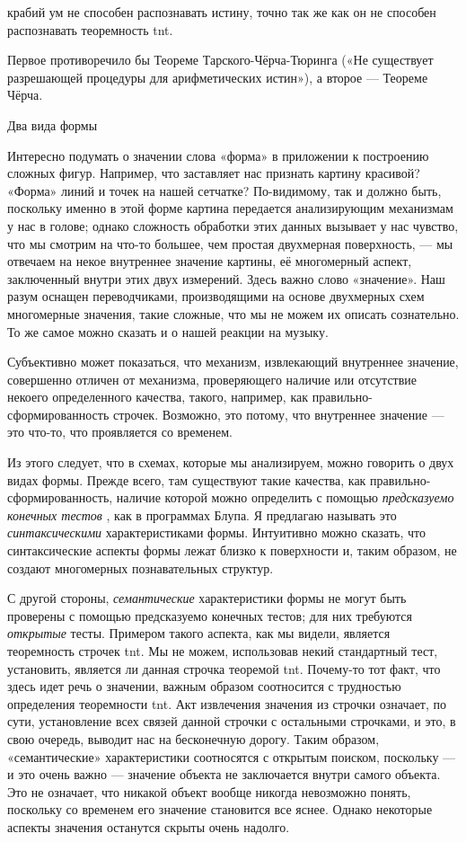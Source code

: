 \documentclass[../main.tex]{subfiles}
\begin{document}
крабий ум не способен распознавать истину, точно так же как он не способен распознавать теоремность \acs{tnt}.

Первое противоречило бы Теореме Тарского-Чёрча-Тюринга («Не существует разрешающей процедуры для арифметических истин»), а второе --- Теореме Чёрча.

Два вида формы

Интересно подумать о значении слова «форма» в приложении к построению сложных фигур. Например, что заставляет нас признать картину красивой? «Форма» линий и точек на нашей сетчатке? По-видимому, так и должно быть, поскольку именно в этой форме картина передается анализирующим механизмам у нас в голове; однако сложность обработки этих данных вызывает у нас чувство, что мы смотрим на что-то большее, чем простая двухмерная поверхность, --- мы отвечаем на некое внутреннее значение картины, её многомерный аспект, заключенный внутри этих двух измерений. Здесь важно слово «значение». Наш разум оснащен переводчиками, производящими на основе двухмерных схем многомерные значения, такие сложные, что мы не можем их описать сознательно. То же самое можно сказать и о нашей реакции на музыку.

Субъективно может показаться, что механизм, извлекающий внутреннее значение, совершенно отличен от механизма, проверяющего наличие или отсутствие некоего определенного качества, такого, например, как правильно-сформированность строчек. Возможно, это потому, что внутреннее значение --- это что-то, что проявляется со временем.

Из этого следует, что в схемах, которые мы анализируем, можно говорить о двух видах формы. Прежде всего, там существуют такие качества, как правильно-сформированность, наличие которой можно определить с помощью \emph{предсказуемо конечных тестов} , как в программах Блупа. Я предлагаю называть это \emph{синтаксическими} характеристиками формы. Интуитивно можно сказать, что синтаксические аспекты формы лежат близко к поверхности и, таким образом, не создают многомерных познавательных структур.

С другой стороны, \emph{семантические} характеристики формы не могут быть проверены с помощью предсказуемо конечных тестов; для них требуются \emph{открытые} тесты. Примером такого аспекта, как мы видели, является теоремность строчек \acs{tnt}\@. Мы не можем, использовав некий стандартный тест, установить, является ли данная строчка теоремой \acs{tnt}\@. Почему-то тот факт, что здесь идет речь о значении, важным образом соотносится с трудностью определения теоремности \acs{tnt}\@. Акт извлечения значения из строчки означает, по сути, установление всех связей данной строчки с остальными строчками, и это, в свою очередь, выводит нас на бесконечную дорогу. Таким образом, «семантические» характеристики соотносятся с открытым поиском, поскольку --- и это очень важно --- значение объекта не заключается внутри самого объекта. Это не означает, что никакой объект вообще никогда невозможно понять, поскольку со временем его значение становится все яснее. Однако некоторые аспекты значения останутся скрыты очень надолго.
\end{document}
